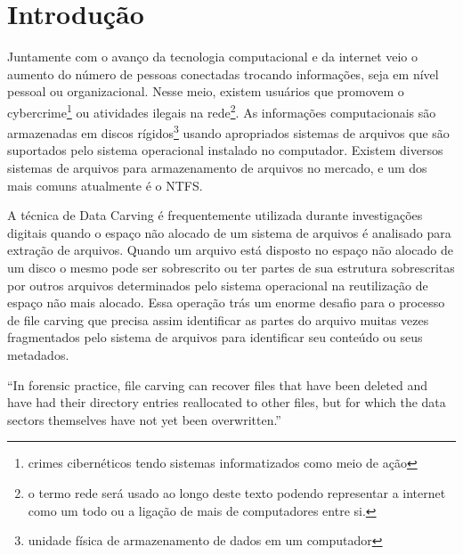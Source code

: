 \chapter{Introdução}
Juntamente com o avanço da tecnologia computacional e da internet veio o aumento do número de pessoas conectadas trocando informações, seja em nível pessoal ou organizacional. Nesse meio, existem usuários que promovem o cybercrime\footnote{crimes cibernéticos tendo sistemas informatizados como meio de ação} ou atividades ilegais na rede\footnote{o termo rede será usado ao longo deste texto podendo representar a internet como um todo ou a ligação de mais de computadores entre si.}. As informações computacionais são armazenadas em discos rígidos\footnote{unidade física de armazenamento de dados em um computador} usando apropriados sistemas de arquivos que são suportados pelo sistema operacional instalado no computador. Existem diversos sistemas de arquivos para armazenamento de arquivos no mercado, e um dos mais comuns atualmente é o NTFS. \cite{iracst}

A técnica de Data Carving é frequentemente utilizada durante investigações digitais quando o espaço não alocado de um sistema de arquivos é analisado para extração de arquivos. Quando um arquivo está disposto no espaço não alocado de um disco o mesmo pode ser sobrescrito ou ter partes de sua estrutura sobrescritas por outros arquivos determinados pelo sistema operacional na reutilização de espaço não mais alocado. Essa operação trás um enorme desafio para o processo de file carving que precisa assim identificar as partes do arquivo muitas vezes fragmentados pelo sistema de arquivos para identificar seu conteúdo ou seus metadados.

``In forensic practice, file carving can recover files that have been deleted and have had their directory entries reallocated to other files, but for which the data sectors themselves have not yet been overwritten.'' \cite{digitalinvestigation}

